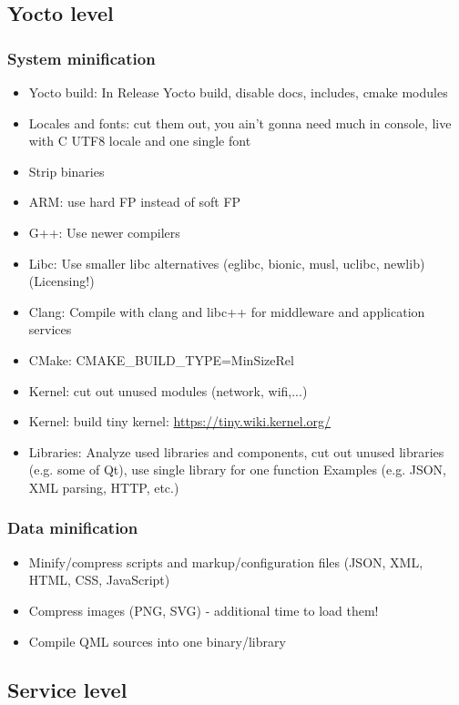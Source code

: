 \documentclass{beamer}
\begin{document}
\subsection{Yocto level}
\begin{frame}
\frametitle{System minification}
	\begin{itemize}
		\item Yocto build: In Release Yocto build, disable docs, includes, cmake modules
		\item Locales and fonts: cut them out, you ain't gonna need much in console, live with C UTF8 locale and one single font
		\item Strip binaries
		\item ARM: use hard FP instead of soft FP
		\item G++: Use newer compilers
		\item Libc: Use smaller libc alternatives (eglibc, bionic, musl, uclibc, newlib) (Licensing!)
		\item Clang: Compile with clang and libc++ for middleware and application services
		\item CMake: CMAKE\_BUILD\_TYPE=MinSizeRel
		\item Kernel: cut out unused modules (network, wifi,...)
		\item Kernel: build tiny kernel: \url{https://tiny.wiki.kernel.org/}
		\item Libraries: Analyze used libraries and components, cut out unused libraries (e.g. some of Qt), use single library for one function Examples (e.g. JSON, XML parsing, HTTP, etc.)
	\end{itemize}
\end{frame}

\begin{frame}
\frametitle{Data minification}
	\begin{itemize}
		\item Minify/compress scripts and markup/configuration files (JSON, XML, HTML, CSS, JavaScript)
		\item Compress images (PNG, SVG) - additional time to load them!
		\item Compile QML sources into one binary/library
	\end{itemize}
\end{frame}

\subsection{Service level}
\end{document}
